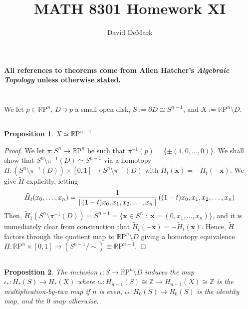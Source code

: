 \documentclass[english]{article}
\title{MATH 8301 Homework XI}
\author{David DeMark}
\date{\due}
\renewcommand\vec{\mathbf}
\DeclarePairedDelimiter\norm{\lVert}{\rVert}%
\newcommand{\RR}{\mathbb{R}}
\newcommand{\ZZ}{\mathbb{Z}}
\newcommand{\prob}[1]{\setcounter{section}{#1-1}\section{}}
\newcommand{\prt}[1]{\setcounter{subsection}{#1-1}\subsection{}}
\newtheorem*{proposition*}{Proposition}
\theoremstyle{remark}
\theoremstyle{definition}
\newcommand{\tH}{\tilde{H}}
\newcommand{\del}{\partial}
\newcommand{\RP}{{\RR\mathrm{P}}}
\begin{document}
\maketitle

\noindent\textbf{All references to theorems come from Allen Hatcher's \emph{Algebraic Topology} unless otherwise stated.}
\prob{1} We let $p\in \RP^n$, $D\ni p$ a small open disk, $S:=\del D \cong S^{n-1}$, and $X:=\RP^n\setminus D$.  
\prt{1} \begin{proposition*}
	$X\simeq \RP^{n-1}$.
\end{proposition*}
\begin{proof}
	We let $\pi: S^n\to \RP^n$ be such that $\pi^{-1}(p)=\{\pm (1,0,\ldots,0)\}$. We shall show that $S^n\setminus \pi^{-1}(D)\simeq S^{n-1}$ via a homotopy $\tH:\left(S^n\setminus \pi^{-1}(D)\right)\times [0,1]\to S^n\setminus \pi^{-1}(D)$ with $\tH_t(\vec{x})=-\tH_t(-\vec{x})$. We give $\tH$ explicitly, letting 
	$$\tH_t(x_0,\ldots,x_n)=\frac{1}{\norm{(1-t)x_0,x_1,x_2,\ldots,x_n}}\left((1-t)x_0,x_1,x_2,\ldots,x_n\right)$$
	Then, $\tH_1(S^n\setminus \pi^{-1}(D))=S^{n-1}=\{\vec{x}\in S^n\;:\; \vec{x}=(0,x_1,\ldots,x_n)\}$, and it is immediately clear from construction that $\tH_t(-\vec{x})=-\tH_t(\vec{x})$. Hence, $\tH$ factors through the quotient map to $\RP^n\setminus D$ giving a homotopy equivalence $H:\RP^n\times [0,1]\to (S^{n-1}/\sim)\cong \RP^{n-1}$.
\end{proof}
\prt{2}
\begin{proposition*}The inclusion $\iota:S\to \RP^n\setminus D$ induces the map $\iota_*:H_*(S)\to H_*(X)$ where $\iota_*:H_{n-1}(S)\cong \ZZ\to H_{n-1}(X)\cong \ZZ$ is the multiplication-by-two map if $n$ is even, $\iota_*:H_0(S)\to H_0(S)$ is the identity map, and the $0$ map otherwise. \end{proposition*}
\end{document}
